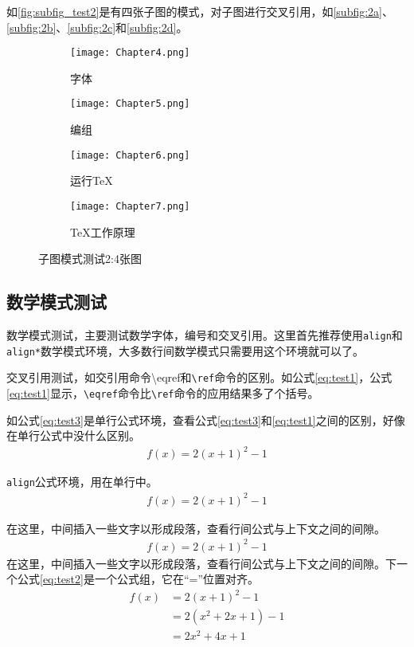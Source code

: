 如\autoref{fig:subfig_test2}是有四张子图的模式，对子图进行交叉引用，如\autoref{subfig:2a}、\autoref{subfig:2b}、\autoref{subfig:2c}和\autoref{subfig:2d}。

\begin{figure}[htbp]
	\centering
	\begin{subfigure}[b]{.4\textwidth}
		\centering
		\texttt{[image: Chapter4.png]}
		\caption{字体}\label{subfig:2a}
	\end{subfigure}
	\begin{subfigure}[b]{.4\textwidth}
		\centering
		\texttt{[image: Chapter5.png]}
		\caption{编组}\label{subfig:2b}
	\end{subfigure}
	\begin{subfigure}[b]{.4\textwidth}
		\centering
		\texttt{[image: Chapter6.png]}
		\caption{运行\TeX}\label{subfig:2c}
	\end{subfigure}
	\begin{subfigure}[b]{.4\textwidth}
		\centering
		\texttt{[image: Chapter7.png]}
		\caption{\TeX 工作原理}\label{subfig:2d}
	\end{subfigure}
	\caption{子图模式测试2:4张图}\label{fig:subfig_test2}
\end{figure}

\subsection{数学模式测试}
数学模式测试，主要测试数学字体，编号和交叉引用。这里首先推荐使用\texttt{align}和\texttt{align*}数学模式环境，大多数行间数学模式只需要用这个环境就可以了。

交叉引用测试，如交引用命令{\ttfamily \textbackslash eqref}和\texttt{\textbackslash ref}命令的区别。如公式\eqref{eq:test1}，公式\ref{eq:test1}显示，\texttt{\textbackslash eqref}命令比\texttt{\textbackslash ref}命令的应用结果多了个括号。

如公式\eqref{eq:test3}是单行公式环境，查看公式\eqref{eq:test3}和\eqref{eq:test1}之间的区别，好像在单行公式中没什么区别。
\begin{align}\label{eq:test3}
	f(x) = 2(x + 1)^{2} - 1
\end{align}

\texttt{align}公式环境，用在单行中。
\begin{align}\label{eq:test1}
	f(x) = 2(x + 1)^{2} - 1
\end{align}

在这里，中间插入一些文字以形成段落，查看行间公式与上下文之间的间隙。
\begin{align*}
	f(x) = 2(x + 1)^{2} - 1
\end{align*}
在这里，中间插入一些文字以形成段落，查看行间公式与上下文之间的间隙。下一个公式\eqref{eq:test2}是一个公式组，它在“=”位置对齐。
\begin{align}\label{eq:test2}
	f(x) & = 2(x + 1)^{2} - 1\\
		 & = 2(x^{2} + 2x +1)-1\\
		 & = 2x^{2} + 4x + 1
\end{align}


